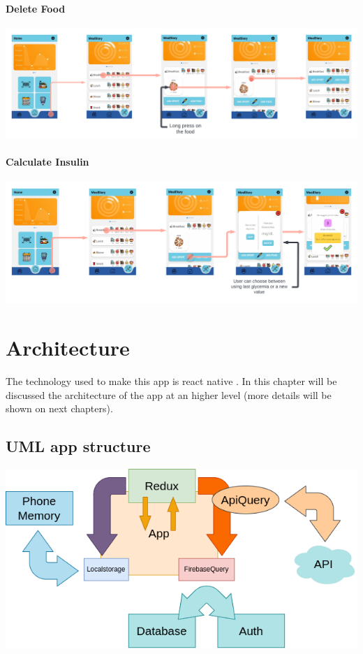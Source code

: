 \documentclass[12pt,hidelinks]{article}
\begin{document}
\newpage
\paragraph{Delete Food}

\begin{center}
	\includegraphics[scale=0.112]{Delete Food}
\end{center}


\paragraph{Calculate Insulin}
\begin{center}
	\includegraphics[scale=0.116]{Insulin Calculation}
\end{center}

\newpage
\section{Architecture}
\vspace{10.5cm}
	The technology used to make this app is react native \cite{React Native}.
	In this chapter will be discussed the architecture of the app at an higher level (more details will be shown on next chapters).
\subsection{UML app structure}	
\begin{center}
	\includegraphics[scale=0.4]{Architecture}
\end{center}
\end{document}
